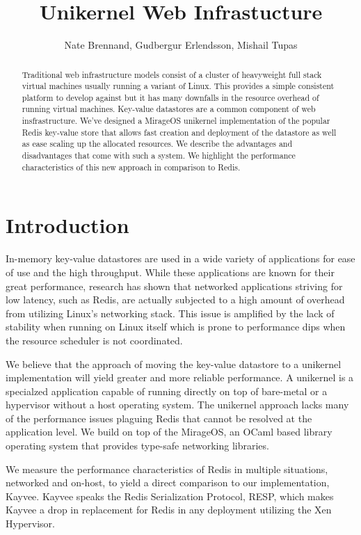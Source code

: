 \documentclass[english,10pt,twocolumn]{article}
\begin{document}
\title{Unikernel Web Infrastucture}
\author{Nate Brennand, Gudbergur Erlendsson, Mishail Tupas}
\date{}
\maketitle
\thispagestyle{empty}

\begin{abstract}
  Traditional web infrastructure models consist of a cluster of heavyweight full stack virtual machines usually running a variant of Linux.
  This provides a simple consistent platform to develop against but it has many downfalls in the resource overhead of running virtual machines.
  Key-value datastores are a common component of web insfrastructure.
  We've designed a MirageOS\cite{mirage} unikernel implementation of the popular Redis\cite{redis} key-value store that allows fast creation and deployment of the datastore as well as ease scaling up the allocated resources.
  We describe the advantages and disadvantages that come with such a system.
  We highlight the performance characteristics of this new approach in comparison to Redis.
\end{abstract}

\section{Introduction}
  In-memory key-value datastores are used in a wide variety of applications for ease of use and the high throughput.
  While these applications are known for their great performance, research has shown that networked applications striving for low latency, such as Redis, are actually subjected to a high amount of overhead from utilizing Linux's networking stack.\cite{arrakis}
  This issue is amplified by the lack of stability when running on Linux itself which is prone to performance dips when the resource scheduler is not coordinated.

  We believe that the approach of moving the key-value datastore to a unikernel implementation will yield greater and more reliable performance.
  A unikernel is a specialzed application capable of running directly on top of bare-metal or a hypervisor without a host operating system.
  The unikernel approach lacks many of the performance issues plaguing Redis that cannot be resolved at the application level.
  We build on top of the MirageOS\cite{mirage}, an OCaml based library operating system that provides type-safe networking libraries.

  We measure the performance characteristics of Redis in multiple situations, networked and on-host, to yield a direct comparison to our implementation, Kayvee.
  Kayvee speaks the Redis Serialization Protocol\cite{redis-protocol}, RESP, which makes Kayvee a drop in replacement for Redis in any deployment utilizing the Xen Hypervisor.
\end{document}
